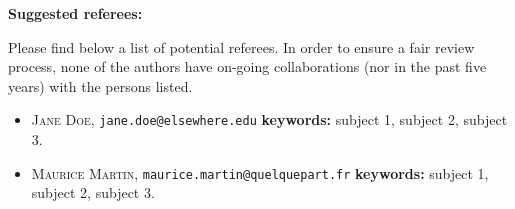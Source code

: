 \documentclass{article}
\begin{document}
\vspace{2em}


\textbf{Suggested referees:}

Please find below a list of potential referees.
In order to ensure a fair review process, none of the authors have on-going collaborations (nor in the past five years) with the persons listed.

\begin{itemize}
\item \textsc{Jane Doe},
  \texttt{jane.doe@elsewhere.edu}
  \newline \textbf{keywords:} subject 1, subject 2, subject 3.

\item \textsc{Maurice Martin},
  \texttt{maurice.martin@quelquepart.fr}
  \newline \textbf{keywords:} subject 1, subject 2, subject 3.
\end{itemize}
\end{document}
